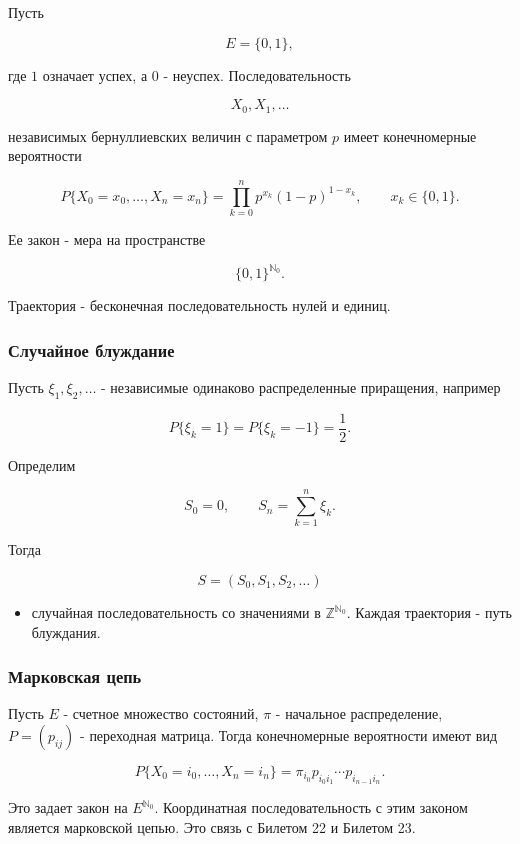 \documentclass[
  11pt,
  a4paper,
]{article}
\providecommand{\tightlist}{%
  \setlength{\itemsep}{0pt}\setlength{\parskip}{0pt}}
\begin{document}
Пусть

\[
E=\{0,1\},
\]

где \(1\) означает успех, а \(0\) - неуспех. Последовательность

\[
X_0,X_1,\ldots
\]

независимых бернуллиевских величин с параметром \(p\) имеет
конечномерные вероятности

\[
P\{X_0=x_0,\ldots,X_n=x_n\}
=
\prod_{k=0}^n p^{x_k}(1-p)^{1-x_k},
\qquad
x_k\in\{0,1\}.
\]

Ее закон - мера на пространстве

\[
\{0,1\}^{\mathbb N_0}.
\]

Траектория - бесконечная последовательность нулей и единиц.

\subsubsection{Случайное
блуждание}\label{ux441ux43bux443ux447ux430ux439ux43dux43eux435-ux431ux43bux443ux436ux434ux430ux43dux438ux435}

Пусть \(\xi_1,\xi_2,\ldots\) - независимые одинаково распределенные
приращения, например

\[
P\{\xi_k=1\}=P\{\xi_k=-1\}=\frac12.
\]

Определим

\[
S_0=0,
\qquad
S_n=\sum_{k=1}^n \xi_k.
\]

Тогда

\[
S=(S_0,S_1,S_2,\ldots)
\]

\begin{itemize}
\tightlist
\item
  случайная последовательность со значениями в
  \(\mathbb Z^{\mathbb N_0}\). Каждая траектория - путь блуждания.
\end{itemize}

\subsubsection{Марковская
цепь}\label{ux43cux430ux440ux43aux43eux432ux441ux43aux430ux44f-ux446ux435ux43fux44c}

Пусть \(E\) - счетное множество состояний, \(\pi\) - начальное
распределение, \(P=(p_{ij})\) - переходная матрица. Тогда конечномерные
вероятности имеют вид

\[
P\{X_0=i_0,\ldots,X_n=i_n\}
=
\pi_{i_0}p_{i_0i_1}\cdots p_{i_{n-1}i_n}.
\]

Это задает закон на \(E^{\mathbb N_0}\). Координатная последовательность
с этим законом является марковской цепью. Это связь с Билетом 22 и
Билетом 23.
\end{document}
